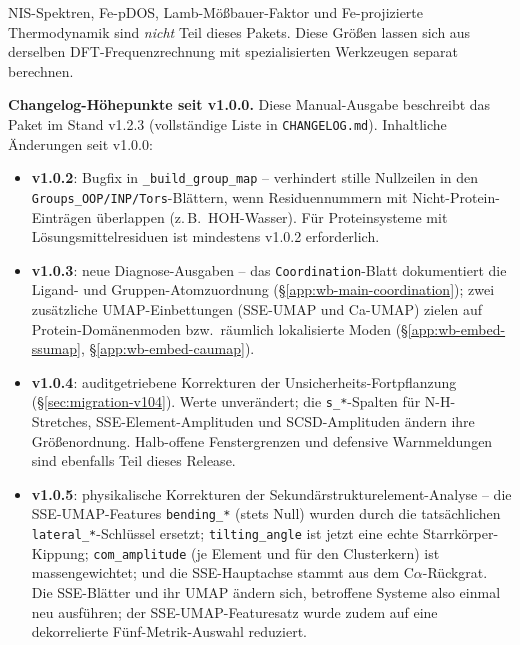 \documentclass[11pt,a4paper,twoside]{article}
\theoremstyle{remark}
\begin{document}
NIS-Spektren, Fe-pDOS, Lamb-M\"o\ss bauer-Faktor und
Fe-projizierte Thermodynamik sind \emph{nicht} Teil dieses Pakets.
Diese Gr\"o\ss en lassen sich aus derselben DFT-Frequenzrechnung mit
spezialisierten Werkzeugen separat berechnen.

\begin{infobox}
\textbf{Changelog-H\"ohepunkte seit v1.0.0.}
Diese Manual-Ausgabe beschreibt das Paket im Stand v1.2.3
(vollst\"andige Liste in \texttt{CHANGELOG.md}). Inhaltliche
\"Anderungen seit v1.0.0:
\begin{itemize}\setlength{\itemsep}{0pt}
  \item \textbf{v1.0.2}: Bugfix in \texttt{\_build\_group\_map} --
        verhindert stille Nullzeilen in den
        \texttt{Groups\_OOP/INP/Tors}-Bl\"attern, wenn Residuennummern
        mit Nicht-Protein-Eintr\"agen \"uberlappen (z.\,B.\ HOH-Wasser).
        F\"ur Proteinsysteme mit L\"osungsmittelresiduen ist
        mindestens v1.0.2 erforderlich.
  \item \textbf{v1.0.3}: neue Diagnose-Ausgaben -- das
        \texttt{Coordination}-Blatt dokumentiert die Ligand- und
        Gruppen-Atomzuordnung (\S\ref{app:wb-main-coordination});
        zwei zus\"atzliche UMAP-Einbettungen (SSE-UMAP und Ca-UMAP)
        zielen auf Protein-Dom\"anenmoden bzw.\ r\"aumlich
        lokalisierte Moden (\S\ref{app:wb-embed-ssumap},
        \S\ref{app:wb-embed-caumap}).
  \item \textbf{v1.0.4}: auditgetriebene Korrekturen der
        Unsicherheits-Fortpflanzung (\S\ref{sec:migration-v104}).
        Werte unver\"andert; die \texttt{s\_*}-Spalten f\"ur
        N-H-Stretches, SSE-Element-Amplituden und SCSD-Amplituden
        \"andern ihre Gr\"o\ss enordnung. Halb-offene
        Fenstergrenzen und defensive Warnmeldungen sind ebenfalls
        Teil dieses Release.
  \item \textbf{v1.0.5}: physikalische Korrekturen der
        Sekund\"arstrukturelement-Analyse -- die SSE-UMAP-Features
        \texttt{bending\_*} (stets Null) wurden durch die tats\"achlichen
        \texttt{lateral\_*}-Schl\"ussel ersetzt; \texttt{tilting\_angle}
        ist jetzt eine echte Starrk\"orper-Kippung; \texttt{com\_amplitude}
        (je Element und f\"ur den Clusterkern) ist massengewichtet; und die
        SSE-Hauptachse stammt aus dem C$\alpha$-R\"uckgrat. Die SSE-Bl\"atter
        und ihr UMAP \"andern sich, betroffene Systeme also einmal neu
        ausf\"uhren; der SSE-UMAP-Featuresatz wurde zudem auf eine
        dekorrelierte F\"unf-Metrik-Auswahl reduziert.

\end{itemize}
\end{infobox}
\end{document}
